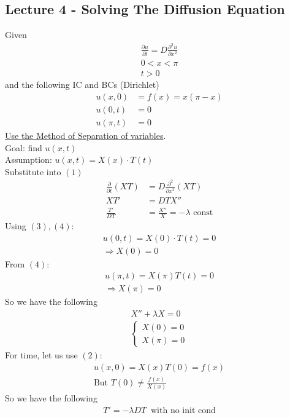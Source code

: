 \documentclass[12pt, letterpaper]{article}
\begin{document}
\subsection{Lecture 4 - Solving The Diffusion Equation}
Given \begin{align*}
    \frac{\partial u}{\partial t} = D \frac{\partial^2 u}{\partial x^2} \tag{1}\\
    0 < x < \pi \\
    t > 0
\end{align*}
and the following IC and BCs (Dirichlet) 
\begin{align*}
    u(x,0) &= f(x) = x(\pi -x) \tag{2}\\
    u(0,t) &= 0 \tag{3}\\
    u(\pi,t) &= 0 \tag{4}
\end{align*}
\underline{Use the Method of Separation of variables}. \\
Goal: find $u(x,t)$ \\
Assumption: $u(x,t) = X(x)\cdot T(t)$ \\
Substitute into $(1)$
\begin{align*}
    \frac{\partial}{\partial t}(XT) &= D \frac{\partial^2}{\partial x^2}(XT) \\
    XT' &= DTX'' \\
    \frac{T'}{DT} &= \frac{X''}{X} = -\lambda \text{ const}
\end{align*}
Using $(3),(4)$:
\begin{align*}
    u(0,t) = X(0) \cdot T(t) = 0 \\
    \Rightarrow X(0) = 0
\end{align*}
From $(4)$:
\begin{align*}
    u(\pi, t) = X(\pi)T(t) = 0 \\
    \Rightarrow X(\pi) = 0
\end{align*}
So we have the following
\begin{align*}
    X'' + \lambda X = 0 \\
    \begin{cases}
        X(0) = 0 \\
        X(\pi) = 0
    \end{cases} 
    \tag{$\ast$}
\end{align*}
For time, let us use $(2)$:
\begin{align*}
    u(x,0) = X(x) T(0) = f(x) \\
    \text{But } T(0) \ne \frac{f(x)}{X(x)}
\end{align*}
So we have the following 
\begin{align*}
    T' = -\lambda D T\ \text{ with no init cond}\tag{$\ast \ast$}
\end{align*}
\end{document}
